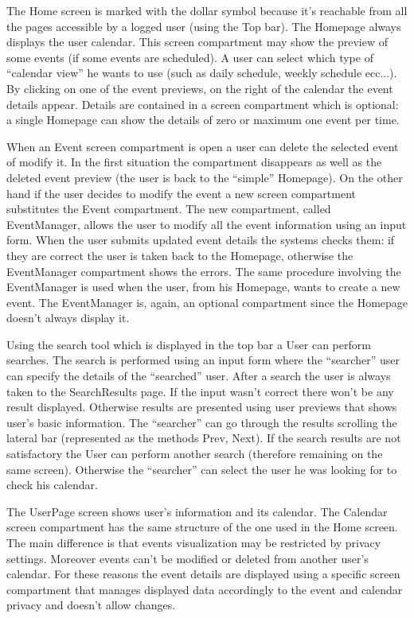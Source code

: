 \documentclass[10pt,a4paper,titlepage]{article}
\begin{document}
The Home screen is marked with the dollar symbol because it’s reachable from all the pages accessible by a logged user (using the Top bar). The Homepage always displays the user calendar. This screen compartment may show the preview of some events (if some events are scheduled).  A user can select which type of “calendar view” he wants to use (such as daily schedule, weekly schedule ecc...). By clicking on one of the event previews, on the right of the calendar the event details appear. Details are contained in a screen compartment which is optional: a single Homepage can show the details of zero or maximum one event per time. 

When an Event screen compartment is open a user can delete the selected event of modify it. In the first situation the compartment disappears as well as the deleted event preview (the user is back to the “simple” Homepage). 
On the other hand if the user decides to modify the event a new screen compartment substitutes the Event compartment. The new compartment, called EventManager, allows the user to modify all the event information using an input form. When the user submits updated event details the systems checks them: if they are correct the user is taken back to the Homepage, otherwise the EventManager compartment shows the errors. 
The same procedure involving the EventManager is used when the user, from his Homepage, wants to create a new event.  The EventManager is, again, an optional compartment since the Homepage doesn’t always display it.

Using the search tool which is displayed in the top bar a User can perform searches.  The search is performed using an input form where the “searcher” user can specify the details of the “searched” user. After a search the user is always taken to the SearchResults page. If the input wasn’t correct there won’t be any result displayed. Otherwise results are presented using user previews that shows user’s basic information. The “searcher” can go through the results scrolling the lateral bar (represented as the methods Prev, Next). 
If the search results are not satisfactory the User can perform another search (therefore remaining on the same screen). Otherwise the “searcher” can select the user he was looking for to check his calendar.

The UserPage screen shows user’s information and its calendar. The Calendar screen compartment has the same structure of the one used in the Home screen. The main difference is that events visualization may be restricted by privacy settings. Moreover events can’t be modified or deleted from another user’s calendar. For these reasons the event details are displayed using a specific screen compartment that manages displayed data accordingly to the event and calendar privacy and doesn’t allow changes.
\end{document}
